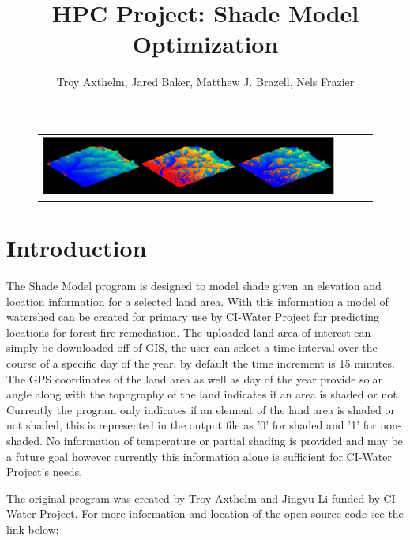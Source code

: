 \documentclass[]{article}%
\title{HPC Project: Shade Model Optimization}
\author{Troy Axthelm, Jared Baker, Matthew J. Brazell, Nels Frazier}
\begin{document}
\maketitle
\begin{figure}[H]
\centering
  \begin{tabular}{@{}cccc@{}}
    \includegraphics[width=.75\textwidth]{./figures/titleBar.png} 
  \end{tabular}
  \label{}
\end{figure}




\section{Introduction}


The Shade Model program is designed to model shade given an elevation and location information for a selected land area. With this information a model of watershed can be created for primary use by CI-Water Project for predicting locations for forest fire remediation. The uploaded land area of interest can simply be downloaded off of GIS, the user can select a time interval over the course of a specific day of the year, by default the time increment is 15 minutes. The GPS coordinates of the land area as well as day of the year provide solar angle along with the topography of the land indicates if an area is shaded or not. Currently the program  only indicates if an element of the land area is shaded or not shaded, this is represented in the output file as '0' for shaded and '1' for non-shaded. No information of temperature or partial shading is provided and may be a future goal however currently this information alone is sufficient for CI-Water Project's needs.

The original program was created by Troy Axthelm and Jingyu Li  funded by CI-Water Project. For more information and location of the open source code see the link below:
\end{document}
